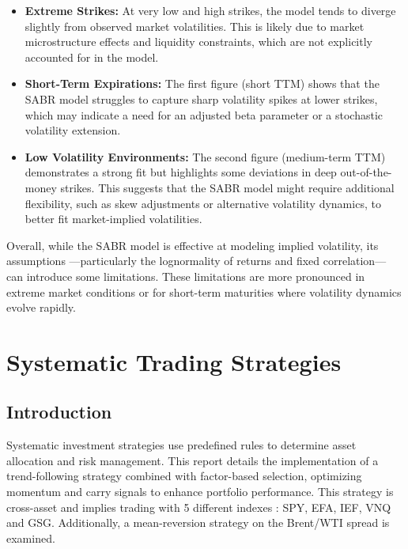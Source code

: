 \documentclass[11pt, oneside, a4paper, titlepage]{report}
\begin{document}
\begin{itemize}
    \item \textbf{Extreme Strikes:} At very low and high strikes, the model tends to diverge slightly from observed market volatilities. This is likely due to market microstructure effects and liquidity constraints, which are not explicitly accounted for in the model.
    \item \textbf{Short-Term Expirations:} The first figure (short TTM) shows that the SABR model struggles to capture sharp volatility spikes at lower strikes, which may indicate a need for an adjusted beta parameter or a stochastic volatility extension.
    \item \textbf{Low Volatility Environments:} The second figure (medium-term TTM) demonstrates a strong fit but highlights some deviations in deep out-of-the-money strikes. This suggests that the SABR model might require additional flexibility, such as skew adjustments or alternative volatility dynamics, to better fit market-implied volatilities.
\end{itemize}

Overall, while the SABR model is effective at modeling implied volatility, its assumptions —particularly the lognormality of returns and fixed correlation— can introduce some limitations. These limitations are more pronounced in extreme market conditions or for short-term maturities where volatility dynamics evolve rapidly.




\chapter{Systematic Trading Strategies}
\section{Introduction}
Systematic investment strategies use predefined rules to determine asset allocation and risk management. This report details the implementation of a trend-following strategy combined with factor-based selection, optimizing momentum and carry signals to enhance portfolio performance. This strategy is cross-asset and implies trading with 5 different indexes : SPY, EFA, IEF, VNQ and GSG. Additionally, a mean-reversion strategy on the Brent/WTI spread is examined.
\end{document}

